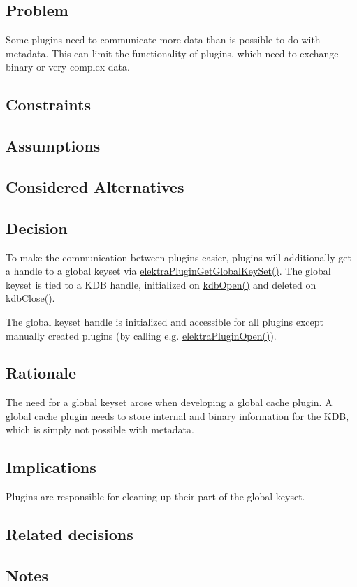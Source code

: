 \subsection*{Problem}

Some plugins need to communicate more data than is possible to do with metadata. This can limit the functionality of plugins, which need to exchange binary or very complex data.

\subsection*{Constraints}

\subsection*{Assumptions}

\subsection*{Considered Alternatives}

\subsection*{Decision}

To make the communication between plugins easier, plugins will additionally get a handle to a global keyset via {\ttfamily \hyperlink{group__plugin_ga436cda13ed70c0face08661a90620bf6}{elektra\+Plugin\+Get\+Global\+Key\+Set()}}. The global keyset is tied to a K\+DB handle, initialized on {\ttfamily \hyperlink{group__kdb_ga6808defe5870f328dd17910aacbdc6ca}{kdb\+Open()}} and deleted on {\ttfamily \hyperlink{group__kdb_gadb54dc9fda17ee07deb9444df745c96f}{kdb\+Close()}}.

The global keyset handle is initialized and accessible for all plugins except manually created plugins (by calling e.\+g. {\ttfamily \hyperlink{elektra_2plugin_8c_a32a70a7876542c51d153164ac5108a57}{elektra\+Plugin\+Open()}}).

\subsection*{Rationale}

The need for a global keyset arose when developing a global cache plugin. A global cache plugin needs to store internal and binary information for the K\+DB, which is simply not possible with metadata.

\subsection*{Implications}

Plugins are responsible for cleaning up their part of the global keyset.

\subsection*{Related decisions}

\subsection*{Notes}